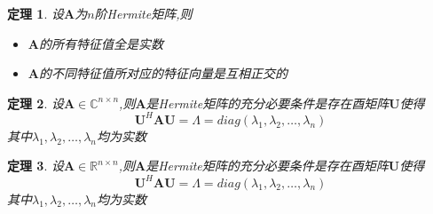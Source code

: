 \documentclass[twoside]{article}
\newtheorem{theorem}{定理}[section]
\begin{document}
    \begin{theorem}
        设$\mathbf{A}$为$n$阶Hermite矩阵,则
        \begin{itemize}
            \item $\mathbf{A}$的所有特征值全是实数
            \item $\mathbf{A}$的不同特征值所对应的特征向量是互相正交的
        \end{itemize}
    \end{theorem}
    
    \begin{theorem}
        设$\mathbf{A}\in\mathds{C}^{n\times n}$,则$\mathbf{A}$是Hermite矩阵的充分必要条件是存在酉矩阵$\mathbf{U}$使得
        \begin{equation}
            \mathbf{U}^H \mathbf{A} \mathbf{U} = \Lambda = diag(\lambda_1, \lambda_2, \dots, \lambda_n)
        \end{equation}
        其中$\lambda_1, \lambda_2, \dots, \lambda_n$均为实数
    \end{theorem}
    
    \begin{theorem}
        设$\mathbf{A}\in\mathds{R}^{n\times n}$,则$\mathbf{A}$是Hermite矩阵的充分必要条件是存在酉矩阵$\mathbf{U}$使得
        \begin{equation}
            \mathbf{U}^H \mathbf{A} \mathbf{U} = \Lambda = diag(\lambda_1, \lambda_2, \dots, \lambda_n)
        \end{equation}
        其中$\lambda_1, \lambda_2, \dots, \lambda_n$均为实数
    \end{theorem}
\end{document}
